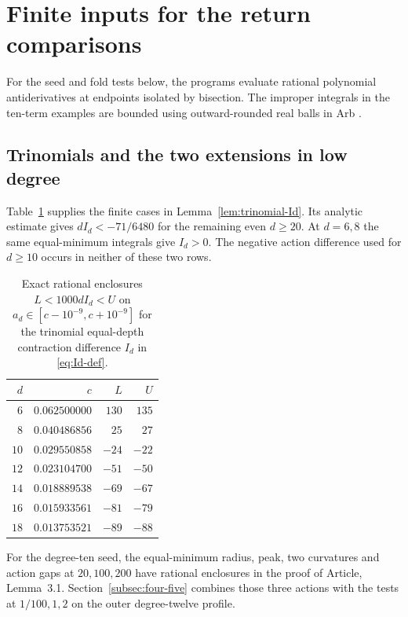 \section{Finite inputs for the return comparisons}\label{sec:reproduce}\label{sec:finite-inputs}
\hypertarget{finite.inputs}{}

For the seed and fold tests below, the programs evaluate rational
polynomial antiderivatives at endpoints isolated by bisection.
The improper integrals in the ten-term examples are bounded using
outward-rounded real balls in Arb \cite{Johansson2017}.

\subsection{Trinomials and the two extensions in low degree}\label{subsec:finite-seed}
Table~\ref{tab:trinomial-cert} supplies the finite cases in
Lemma~\ref{lem:trinomial-Id}. Its analytic estimate gives
$dI_d<-71/6480$ for the remaining even $d\ge20$. At $d=6,8$ the same equal-minimum integrals give $I_d>0$.
The negative action difference used for $d\ge10$ occurs in neither
of these two rows.

\begin{table}[htbp]
  \centering
  \small
  \caption{Exact rational enclosures $L<1000dI_d<U$ on $a_d\in[c-10^{-9},c+10^{-9}]$ for the trinomial
  equal-depth contraction difference $I_d$ in \eqref{eq:Id-def}.}
  \label{tab:trinomial-cert}
  \begin{tabular}{@{}rrrr@{}}
    \toprule
    $d$ & $c$ & $L$ & $U$ \\
    \midrule
    $6$  & $0.062500000$ & $130$ & $135$ \\
    $8$  & $0.040486856$ & $25$  & $27$  \\
    $10$ & $0.029550858$ & $-24$ & $-22$ \\
    $12$ & $0.023104700$ & $-51$ & $-50$ \\
    $14$ & $0.018889538$ & $-69$ & $-67$ \\
    $16$ & $0.015933561$ & $-81$ & $-79$ \\
    $18$ & $0.013753521$ & $-89$ & $-88$ \\
    \bottomrule
  \end{tabular}
\end{table}

For the degree-ten seed, the equal-minimum radius, peak, two
curvatures and action gaps at $20,100,200$ have rational enclosures
in the proof of Article, Lemma~3.1. Section~\ref{subsec:four-five}
combines those three actions with the tests at $1/100,1,2$ on the
outer degree-twelve profile.

